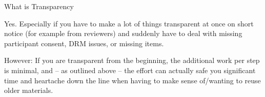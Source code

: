 \begin{block}{What is Transparency}
  
  Yes. Especially if you have to make a lot of things transparent at once on short notice (for example from reviewers) and suddenly have to deal with missing participant consent, DRM issues, or missing items.
  
  However: If you are transparent from the beginning, the additional work per step is minimal, and -- as outlined above -- the effort can actually safe you significant time and heartache down the line when having to make sense of/wanting to reuse older materials.

\end{block}

